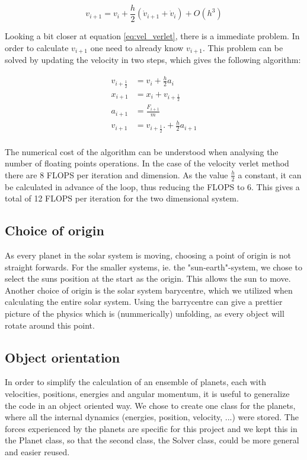 \begin{equation}
v_{i+1} = v_i +  \frac{h}{2} \left(\dot{v}_{i+1}+\dot{v}_i\right)+ O(h^3) \label{eq:vel_verlet}
\end{equation}

Looking a bit closer at equation \ref{eq:vel_verlet}, there is a immediate problem. In order to calculate $ v_{i+1} $ one need to already know $ v_{i+1} $. This problem can be solved by updating the velocity in two steps, which gives the following algorithm:

\begin{align}
v_{i+\frac{1}{2}} &= v_i + \frac{h}{2} a_i\\
x_{i+1} &= x_i + v_{i+\frac{1}{2}}\\
a_{i+1} &= \frac{F_{i+1}}{m}\\
v_{i+1} &=v_{i+\frac{1}{2}}. + \frac{h}{2} a_{i+1}\\
\end{align} 

The numerical cost of the algorithm can be understood when analysing the number of floating points operations. In the case of the velocity verlet method there are 8 FLOPS per iteration and dimension. As the value $ \frac{h}{2} $ a constant, it can be calculated in advance of the loop, thus reducing the FLOPS to 6. This gives a total of 12 FLOPS per iteration for the two dimensional system. 



\subsection{Choice of origin}

As every planet in the solar system is moving, choosing a point of  origin is not straight forwards. For the smaller systems, ie. the "sun-earth"-system, we chose to select the suns position at the start as the origin. This allows the sun to move. Another choice of origin is the solar system barycentre, which we utilized when calculating the entire solar system. Using the barrycentre can give a prettier picture of the physics which is (nummerically) unfolding, as every object will rotate around this point.


\subsection{Object orientation}
In order to simplify the calculation of an ensemble of planets, each with velocities, positions, energies and angular momentum, it is useful to generalize the code in an object oriented way. We chose to create one class for the planets, where all the internal dynamics (energies, position, velocity, ...) were stored. The forces experienced by the planets are specific for this project and we kept this in the Planet class, so that the second class, the Solver class, could be more general and easier reused.

